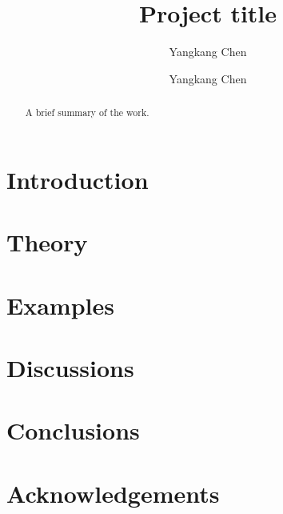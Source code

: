 \documentclass[manuscript,revised]{geophysics}
\begin{document}
\title{Project title}
\author{Yangkang Chen}

\renewcommand{\thefootnote}{\fnsymbol{footnote}}

\author{Yangkang Chen\footnotemark[1]}


\address{
\footnotemark[1]
School of Earth Sciences\\
Zhejiang University\\
Hangzhou, Zhejiang Province, China, 310027\\
yangkang.chen@zju.edu.cn 
}


\begin{abstract}
A brief summary of the work.
\end{abstract}


\section{Introduction}
\section{Theory}
\section{Examples}
\section{Discussions}
\section{Conclusions}
\section{Acknowledgements}







\end{document}
